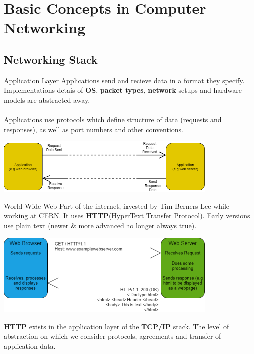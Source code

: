 \chapter{Basic Concepts in Computer Networking}
\section{Networking Stack}
\begin{definitionbox}{Application Layer}
    Applications send and recieve data in a format they specify. Implementations detais of \textbf{OS}, \textbf{packet types}, \textbf{network} setups and hardware models are abstracted away.
    \\
    \\ Applications use protocols which define structure of data (requests and responses), as well as port numbers and other conventions.
    \begin{center}
        \includegraphics[width=0.8\textwidth]{basic_concepts_and_osi/images/application layer.png}
    \end{center}
\end{definitionbox}
\begin{examplebox}{World Wide Web}
    Part of the internet, invested by Tim Berners-Lee while working at CERN. It uses \textbf{HTTP}(HyperText Transfer Protocol). Early versions use plain text (newer \& more advanced no longer always true).
    \begin{center}
        \includegraphics[width=0.8\textwidth]{basic_concepts_and_osi/images/world wide web.png}
    \end{center}
    \textbf{HTTP} exists in the application layer of the \textbf{TCP/IP} stack. The level of abstraction on which we consider protocols, agreements and transfer of application data.
\end{examplebox}

